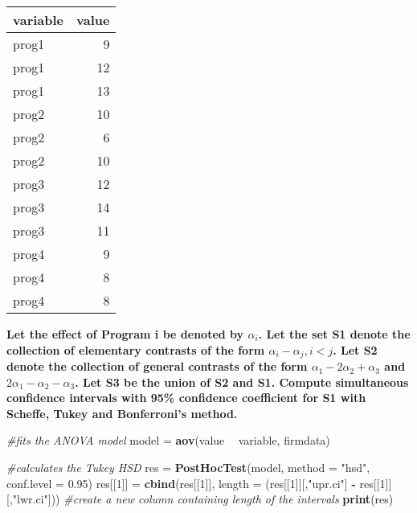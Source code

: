 \documentclass[]{article}
\newenvironment{Shaded}{\begin{snugshade}}{\end{snugshade}}
\newcommand{\KeywordTok}[1]{\textcolor[rgb]{0.13,0.29,0.53}{\textbf{#1}}}
\newcommand{\DataTypeTok}[1]{\textcolor[rgb]{0.13,0.29,0.53}{#1}}
\newcommand{\DecValTok}[1]{\textcolor[rgb]{0.00,0.00,0.81}{#1}}
\newcommand{\FloatTok}[1]{\textcolor[rgb]{0.00,0.00,0.81}{#1}}
\newcommand{\StringTok}[1]{\textcolor[rgb]{0.31,0.60,0.02}{#1}}
\newcommand{\CommentTok}[1]{\textcolor[rgb]{0.56,0.35,0.01}{\textit{#1}}}
\newcommand{\OperatorTok}[1]{\textcolor[rgb]{0.81,0.36,0.00}{\textbf{#1}}}
\newcommand{\NormalTok}[1]{#1}
\begin{document}
\begin{table}[H]
\centering
\begin{tabular}{l|r}
\hline
variable & value\\
\hline
prog1 & 9\\
\hline
prog1 & 12\\
\hline
prog1 & 13\\
\hline
prog2 & 10\\
\hline
prog2 & 6\\
\hline
prog2 & 10\\
\hline
prog3 & 12\\
\hline
prog3 & 14\\
\hline
prog3 & 11\\
\hline
prog4 & 9\\
\hline
prog4 & 8\\
\hline
prog4 & 8\\
\hline
\end{tabular}
\end{table}

\textbf{Let the effect of Program i be denoted by \(\alpha_i\). Let the
set S1 denote the collection of elementary contrasts of the form
\(\alpha_i-\alpha_j, i<j\). Let S2 denote the collection of general
contrasts of the form \(\alpha_1 - 2\alpha_2 + \alpha_3\) and
\(2\alpha_1 - \alpha_2 - \alpha_3\). Let S3 be the union of S2 and S1.
Compute simultaneous confidence intervals with 95\% confidence
coefficient for S1 with Scheffe, Tukey and Bonferroni's method.}

\begin{Shaded}
\begin{Highlighting}[]
\CommentTok{#fits the ANOVA model}
\NormalTok{model =}\StringTok{ }\KeywordTok{aov}\NormalTok{(value }\OperatorTok{~}\StringTok{ }\NormalTok{variable, firmdata)}

\CommentTok{#calculates the Tukey HSD}
\NormalTok{res =}\StringTok{ }\KeywordTok{PostHocTest}\NormalTok{(model, }\DataTypeTok{method =} \StringTok{"hsd"}\NormalTok{, }\DataTypeTok{conf.level =} \FloatTok{0.95}\NormalTok{)  }
\NormalTok{res[[}\DecValTok{1}\NormalTok{]] =}\StringTok{ }\KeywordTok{cbind}\NormalTok{(res[[}\DecValTok{1}\NormalTok{]], }\DataTypeTok{length =}\NormalTok{ (res[[}\DecValTok{1}\NormalTok{]][,}\StringTok{"upr.ci"}\NormalTok{] }\OperatorTok{-}\StringTok{ }\NormalTok{res[[}\DecValTok{1}\NormalTok{]][,}\StringTok{"lwr.ci"}\NormalTok{])) }
\CommentTok{#create a new column containing length of the intervals}
\KeywordTok{print}\NormalTok{(res)}
\end{Highlighting}
\end{Shaded}
\end{document}
